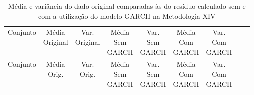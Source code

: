 \clearpage

\begin{center}
\begin{longtable}{ccccccccc}
\toprule
\rowcolor{white}
\caption[Metodologia XIV: dados estatísticos]{Média e variância do dado original
comparadas às do resíduo calculado sem e com a utilização do modelo GARCH na
Metodologia XIV} \label{tab:DadosEstatisticosMet14}\\
\midrule
    Conjunto & \specialcell{Média\\Original} &
    \specialcell{Var.\\Original} & \specialcell{Média\\Sem\\GARCH} &
    \specialcell{Var.\\Sem\\GARCH} & \specialcell{Média\\Com\\GARCH}&
    \specialcell{Var.\\Com\\GARCH} \\

\midrule
\endfirsthead 
\midrule
\rowcolor{white}
    Conjunto & \specialcell{Média\\Orig.} &
    \specialcell{Var.\\Orig.} & \specialcell{Média\\Sem\\GARCH} &
    \specialcell{Var.\\Sem\\GARCH} & \specialcell{Média\\Com\\GARCH}&
    \specialcell{Var.\\Com\\GARCH} \\


\end{longtable}
\end{center}
